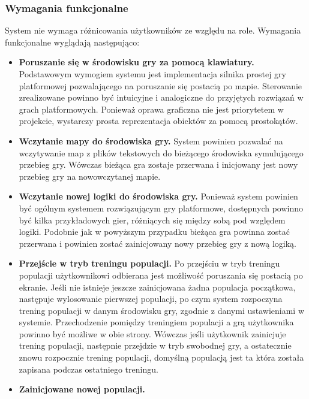 \subsubsection{Wymagania funkcjonalne}
	System nie wymaga różnicowania użytkowników ze względu na role. Wymagania funkcjonalne wyglądają następująco:
	\begin{itemize}
		\item {\bf Poruszanie się w środowisku gry za pomocą klawiatury.}
		\newline
		Podstawowym wymogiem systemu jest implementacja silnika prostej gry platformowej pozwalającego na poruszanie się postacią po mapie.
		Sterowanie zrealizowane powinno być intuicyjne i analogiczne do przyjętych rozwiązań w grach platformowych.
		Ponieważ oprawa graficzna nie jest priorytetem w projekcie, wystarczy prosta reprezentacja obiektów za pomocą prostokątów.
		\item {\bf Wczytanie mapy do środowiska gry.}
		\newline
		System powinien pozwalać na wczytywanie map z plików tekstowych do bieżącego środowiska symulującego przebieg gry.
		Wówczas bieżąca gra zostaje przerwana i inicjowany jest nowy przebieg gry na nowowczytanej mapie.
		\item {\bf Wczytanie nowej logiki do środowiska gry.}
		\newline
		Ponieważ system powinien być ogólnym systemem rozwiązującym gry platformowe, dostępnych powinno być kilka przykładowych gier,
		różniących się między sobą pod względem logiki. Podobnie jak w powyższym przypadku bieżąca gra powinna zostać przerwana i
		powinien zostać zainicjowany nowy przebieg gry z nową logiką.
		\item {\bf Przejście w tryb treningu populacji.}
		\newline
		Po przejściu w tryb treningu populacji użytkownikowi odbierana jest możliwość poruszania się postacią po ekranie.
		Jeśli nie istnieje jeszcze zainicjowana żadna populacja początkowa, następuje wylosowanie pierwszej populacji, po czym system rozpoczyna trening populacji w danym środowisku gry, zgodnie z danymi ustawieniami w systemie. Przechodzenie pomiędzy treningiem populacji a grą użytkownika powinno być możliwe w obie strony. 
		Wówczas jeśli użytkownik zainicjuje trening populacji, następnie przejdzie w tryb swobodnej gry, a ostatecznie znowu rozpocznie trening populacji, domyślną populacją jest ta która została zapisana podczas ostatniego treningu.
		\item {\bf Zainicjowane nowej populacji. }

\end{itemize}

